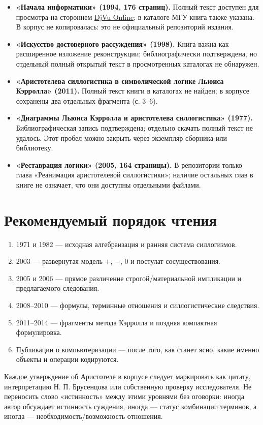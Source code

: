 \documentclass[12pt,a4paper]{article}
\begin{document}
\begin{itemize}
\item \textbf{«Начала информатики» (1994, 176 страниц).} Полный текст доступен для просмотра на стороннем \href{https://djvu.online/file/mkIqfvqkmGScQ}{DjVu Online}; в каталоге МГУ книга также указана. В корпус не копировалась: это не официальный репозиторий издания.
\item \textbf{«Искусство достоверного рассуждения» (1998).} Книга важна как расширенное изложение реконструкции; библиографически подтверждена, но отдельный полный открытый текст в просмотренных каталогах не обнаружен.
\item \textbf{«Аристотелева силлогистика в символической логике Льюиса Кэрролла» (2011).} Полный текст книги в каталогах не найден; в корпусе сохранены два отдельных фрагмента (с. 3–6).
\item \textbf{«Диаграммы Льюиса Кэрролла и аристотелева силлогистика» (1977).} Библиографическая запись подтверждена; отдельно скачать полный текст не удалось. Этот пробел можно закрыть через экземпляр сборника или библиотеку.
\item \textbf{«Реставрация логики» (2005, 164 страницы).} В репозитории только глава «Реанимация аристотелевой силлогистики»; наличие остальных глав в книге не означает, что они доступны отдельными файлами.
\end{itemize}
\section{Рекомендуемый порядок чтения}

\begin{enumerate}
\item 1971 и 1982 — исходная алгебраизация и ранняя система силлогизмов.
\item 2003 — развернутая модель \(+\), \(-\), \(0\) и постулат сосуществования.
\item 2005 и 2006 — прямое различение строгой/материальной импликации и предлагаемого следования.
\item 2008–2010 — формулы, терминные отношения и силлогистические следствия.
\item 2011–2014 — фрагменты метода Кэрролла и поздняя компактная формулировка.
\item Публикации о компьютеризации — после того, как станет ясно, какие именно объекты и операции кодируются.
\end{enumerate}
Каждое утверждение об Аристотеле в корпусе следует маркировать как цитату, интерпретацию Н. П. Брусенцова или собственную проверку исследователя. Не переносить слово «истинность» между этими уровнями без оговорки: иногда автор обсуждает истинность суждения, иногда — статус комбинации терминов, а иногда — необходимость/возможность отношения.
\end{document}
